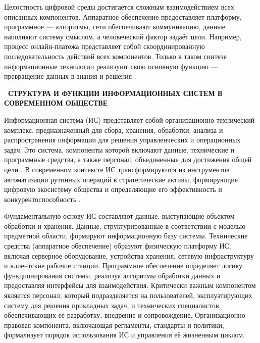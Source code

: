 \documentclass{SibFU-docs}
\begin{document}

Целостность цифровой среды достигается сложным взаимодействием всех описанных компонентов. Аппаратное обеспечение предоставляет платформу, программное — алгоритмы, сети обеспечивают коммуникацию, данные наполняют систему смыслом, а человеческий фактор задаёт цели. Например, процесс онлайн-платежа представляет собой скоординированную последовательность действий всех компонентов. Только в таком синтезе информационные технологии реализуют свою основную функцию — превращение данных в знания и решения \cite{techopedia_it_components}.

\newpage
{}
\begin{center}\textbf{\thesection\ СТРУКТУРА И ФУНКЦИИ ИНФОРМАЦИОННЫХ СИСТЕМ В СОВРЕМЕННОМ ОБЩЕСТВЕ}\end{center}
\vspace*{-1.5em}

Информационная система (ИС) представляет собой организационно-технический комплекс, предназначенный для сбора, хранения, обработки, анализа и распространения информации для решения управленческих и операционных задач. Это система, компоненты которой включают данные, технические и программные средства, а также персонал, объединенные для достижения общей цели \cite{stair_reynolds_2018}. В современном контексте ИС трансформируются из инструментов автоматизации рутинных операций в стратегические активы, формирующие цифровую экосистему общества и определяющие его эффективность и конкурентоспособность \cite{oecd_digital_economy_2019}.


Фундаментальную основу ИС составляют данные, выступающие объектом обработки и хранения. Данные, структурированные в соответствии с моделью предметной области, формируют информационную базу системы. Технические средства (аппаратное обеспечение) образуют физическую платформу ИС, включая серверное оборудование, устройства хранения, сетевую инфраструктуру и клиентские рабочие станции. Программное обеспечение определяет логику функционирования системы, реализуя алгоритмы обработки данных и предоставляя интерфейсы для взаимодействия. Критически важным компонентом является персонал, который подразделяется на пользователей, эксплуатирующих систему для решения прикладных задач, и технических специалистов, обеспечивающих её разработку, внедрение и сопровождение. Организационно-правовая компонента, включающая регламенты, стандарты и политики, формализует порядок использования ИС и управления её жизненным циклом.
\end{document}

